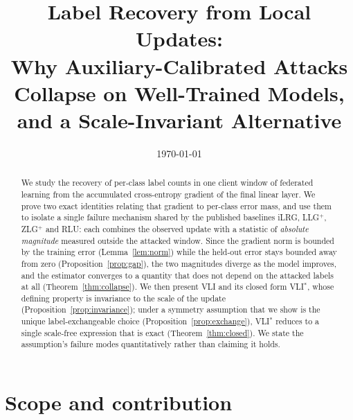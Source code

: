 \documentclass[11pt]{article}
\title{Label Recovery from Local Updates:\\
Why Auxiliary-Calibrated Attacks Collapse on Well-Trained Models,\\
and a Scale-Invariant Alternative}
\author{}
\date{\today}
\theoremstyle{remark}
\begin{document}
\maketitle

\begin{abstract}
We study the recovery of per-class label counts in one client window of
federated learning from the accumulated cross-entropy gradient of the final
linear layer. We prove two exact identities relating that gradient to
per-class error mass, and use them to isolate a single failure mechanism
shared by the published baselines iLRG, LLG$^+$, ZLG$^+$ and RLU: each
combines the observed update with a statistic of \emph{absolute magnitude}
measured outside the attacked window. Since the gradient norm is bounded by
the training error (Lemma~\ref{lem:norm}) while the held-out error stays
bounded away from zero (Proposition~\ref{prop:gap}), the two magnitudes
diverge as the model improves, and the estimator converges to a quantity
that does not depend on the attacked labels at all
(Theorem~\ref{thm:collapse}). We then present VLI and its closed form
VLI$^*$, whose defining property is invariance to the scale of the update
(Proposition~\ref{prop:invariance}); under a symmetry assumption that we show
is the unique label-exchangeable choice (Proposition~\ref{prop:exchange}),
VLI$^*$ reduces to a single scale-free expression that is exact
(Theorem~\ref{thm:closed}). We state the assumption's failure modes
quantitatively rather than claiming it holds.
\end{abstract}

\tableofcontents

\section{Scope and contribution}
\end{document}
